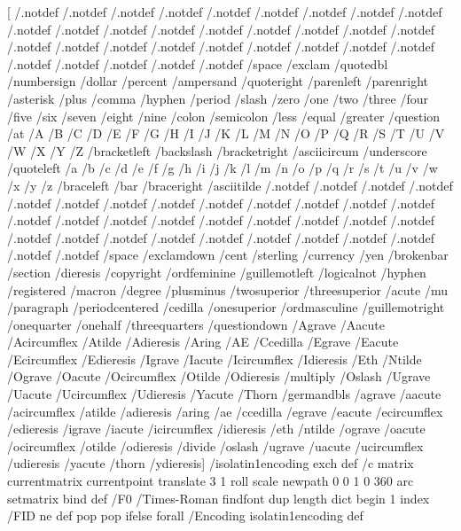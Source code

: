 [ /.notdef /.notdef /.notdef /.notdef /.notdef /.notdef /.notdef /.notdef /.notdef /.notdef
 /.notdef /.notdef /.notdef /.notdef /.notdef /.notdef /.notdef /.notdef /.notdef /.notdef
 /.notdef /.notdef /.notdef /.notdef /.notdef /.notdef /.notdef /.notdef /.notdef /.notdef
 /.notdef /.notdef /space /exclam /quotedbl /numbersign /dollar /percent /ampersand /quoteright
 /parenleft /parenright /asterisk /plus /comma /hyphen /period /slash /zero /one
 /two /three /four /five /six /seven /eight /nine /colon /semicolon
 /less /equal /greater /question /at /A /B /C /D /E
 /F /G /H /I /J /K /L /M /N /O
 /P /Q /R /S /T /U /V /W /X /Y
 /Z /bracketleft /backslash /bracketright /asciicircum /underscore /quoteleft /a /b /c
 /d /e /f /g /h /i /j /k /l /m
 /n /o /p /q /r /s /t /u /v /w
 /x /y /z /braceleft /bar /braceright /asciitilde /.notdef /.notdef /.notdef
 /.notdef /.notdef /.notdef /.notdef /.notdef /.notdef /.notdef /.notdef /.notdef /.notdef
 /.notdef /.notdef /.notdef /.notdef /.notdef /.notdef /.notdef /.notdef /.notdef /.notdef
 /.notdef /.notdef /.notdef /.notdef /.notdef /.notdef /.notdef /.notdef /.notdef /.notdef
 /space /exclamdown /cent /sterling /currency /yen /brokenbar /section /dieresis /copyright
 /ordfeminine /guillemotleft /logicalnot /hyphen /registered /macron /degree /plusminus /twosuperior /threesuperior
 /acute /mu /paragraph /periodcentered /cedilla /onesuperior /ordmasculine /guillemotright /onequarter /onehalf
 /threequarters /questiondown /Agrave /Aacute /Acircumflex /Atilde /Adieresis /Aring /AE /Ccedilla
 /Egrave /Eacute /Ecircumflex /Edieresis /Igrave /Iacute /Icircumflex /Idieresis /Eth /Ntilde
 /Ograve /Oacute /Ocircumflex /Otilde /Odieresis /multiply /Oslash /Ugrave /Uacute /Ucircumflex
 /Udieresis /Yacute /Thorn /germandbls /agrave /aacute /acircumflex /atilde /adieresis /aring
 /ae /ccedilla /egrave /eacute /ecircumflex /edieresis /igrave /iacute /icircumflex /idieresis
 /eth /ntilde /ograve /oacute /ocircumflex /otilde /odieresis /divide /oslash /ugrave
 /uacute /ucircumflex /udieresis /yacute /thorn /ydieresis] /isolatin1encoding exch def
/c { matrix currentmatrix currentpoint translate
     3 1 roll scale newpath 0 0 1 0 360 arc setmatrix } bind def
/F0
    /Times-Roman findfont
    dup length dict begin
	{1 index /FID ne {def} {pop pop} ifelse} forall
	/Encoding isolatin1encoding def
